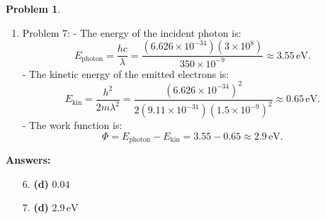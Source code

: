 \documentclass[12pt]{article}
\theoremstyle{definition} %
\newtheorem{problem}{Problem}
\theoremstyle{plain} %
\begin{document}
\begin{problem}
\begin{enumerate}
    \item Problem 7:
    - The energy of the incident photon is:
    $$
    E_{\text{photon}} = \frac{hc}{\lambda} = \frac{(6.626 \times 10^{-34})(3 \times 10^8)}{350 \times 10^{-9}} \approx 3.55 \, \text{eV}.
    $$
    - The kinetic energy of the emitted electrons is:
    $$
    E_{\text{kin}} = \frac{h^2}{2m\lambda^2} = \frac{(6.626 \times 10^{-34})^2}{2(9.11 \times 10^{-31})(1.5 \times 10^{-9})^2} \approx 0.65 \, \text{eV}.
    $$
    - The work function is:
    $$
    \Phi = E_{\text{photon}} - E_{\text{kin}} = 3.55 - 0.65 \approx 2.9 \, \text{eV}.
    $$
\end{enumerate}

\textbf{Answers:}
\begin{enumerate}
    \item[6.] \textbf{(d)} \(0.04\)
    \item[7.] \textbf{(d)} \(2.9 \, \text{eV}\)
\end{enumerate}
\end{problem}
\end{document}
